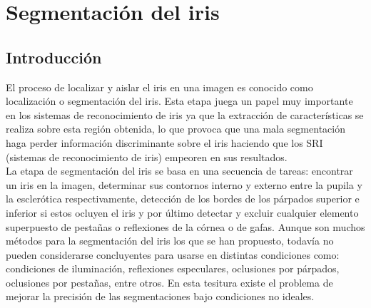 
\chapter{Segmentación del iris} %

\label{Capítulo 4} %




\section{Introducción}

El proceso de localizar y aislar el iris en una imagen es conocido como localización o segmentación del iris. Esta etapa juega un papel muy importante en los sistemas de reconocimiento de iris ya que la extracción de características se realiza sobre esta región obtenida, lo que provoca que una mala segmentación haga perder información discriminante sobre el iris haciendo que los SRI (sistemas de reconocimiento de iris) empeoren en sus resultados. \\

La etapa de segmentación del iris se basa en una secuencia de tareas: encontrar un iris en la imagen, determinar sus contornos interno y externo entre la pupila y la esclerótica respectivamente, detección de los bordes de los párpados superior e inferior si estos ocluyen el iris y por último detectar y excluir cualquier elemento superpuesto de pestañas o reflexiones de la córnea o de gafas. Aunque son muchos métodos para la segmentación del iris los que se han propuesto, todavía no pueden considerarse concluyentes para usarse en distintas condiciones como: condiciones de iluminación, reflexiones especulares, oclusiones por párpados, oclusiones por pestañas, entre otros. En esta tesitura existe el problema de mejorar la precisión de las segmentaciones bajo condiciones no ideales. \\

